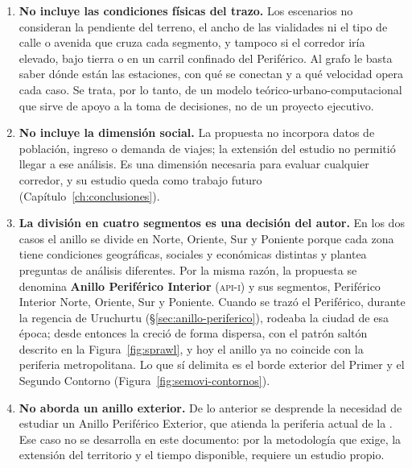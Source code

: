 \begin{enumerate}
    \item \textbf{No incluye las condiciones físicas del trazo.} Los escenarios
    no consideran la pendiente del terreno, el ancho de las vialidades ni el
    tipo de calle o avenida que cruza cada segmento, y tampoco si el corredor
    iría elevado, bajo tierra o en un carril confinado del Periférico. Al grafo
    le basta saber dónde están las estaciones, con qué se conectan y a qué
    velocidad opera cada caso. Se trata, por lo tanto, de un modelo
    teórico-urbano-computacional que sirve de apoyo a la toma de decisiones,
    no de un proyecto ejecutivo.

    \item \textbf{No incluye la dimensión social.} La propuesta no incorpora
    datos de población, ingreso o demanda de viajes; la extensión del estudio
    no permitió llegar a ese análisis. Es una dimensión necesaria para evaluar
    cualquier corredor, y su estudio queda como trabajo futuro
    (Capítulo~\ref{ch:conclusiones}).

    \item \textbf{La división en cuatro segmentos es una decisión del autor.}
    En los dos casos el anillo se divide en Norte, Oriente, Sur y Poniente
    porque cada zona tiene condiciones geográficas, sociales y económicas
    distintas y plantea preguntas de análisis diferentes. Por la misma razón,
    la propuesta se denomina \textbf{Anillo Periférico Interior}
    (\textsc{api-i}) y sus segmentos, Periférico Interior Norte, Oriente, Sur y
    Poniente. Cuando se trazó el Periférico, durante la regencia de Uruchurtu
    (§\ref{sec:anillo-periferico}), rodeaba la ciudad de esa época; desde
    entonces la \zmvm{} creció de forma dispersa, con el patrón saltón
    descrito en la Figura~\ref{fig:sprawl}, y hoy el anillo ya no coincide
    con la periferia metropolitana. Lo que sí delimita es el borde exterior
    del Primer y el Segundo Contorno (Figura~\ref{fig:semovi-contornos}).

    \item \textbf{No aborda un anillo exterior.} De lo anterior se desprende la
    necesidad de estudiar un Anillo Periférico Exterior, que atienda la
    periferia actual de la \zmvm{}. Ese caso no se desarrolla en este
    documento: por la metodología que exige, la extensión del territorio y el
    tiempo disponible, requiere un estudio propio.


\end{enumerate}
